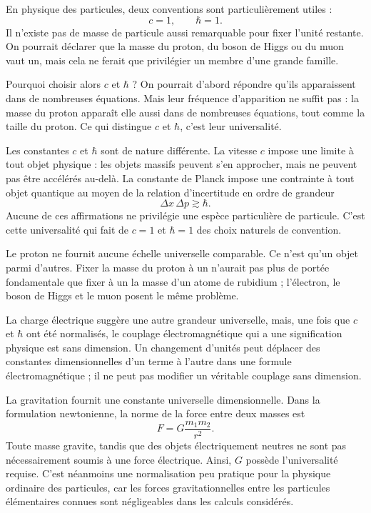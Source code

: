 En physique des particules, deux conventions sont particulièrement utiles :
\begin{equation}
c=1,
\qquad
\hbar=1.
\end{equation}
Il n’existe pas de masse de particule aussi remarquable pour fixer l’unité restante. On pourrait déclarer que la masse du proton, du boson de Higgs ou du muon vaut un, mais cela ne ferait que privilégier un membre d’une grande famille.

Pourquoi choisir alors \(c\) et \(\hbar\) ? On pourrait d’abord répondre qu’ils apparaissent dans de nombreuses équations. Mais leur fréquence d’apparition ne suffit pas : la masse du proton apparaît elle aussi dans de nombreuses équations, tout comme la taille du proton. Ce qui distingue \(c\) et \(\hbar\), c’est leur universalité.

Les constantes \(c\) et \(\hbar\) sont de nature différente. La vitesse \(c\) impose une limite à tout objet physique : les objets massifs peuvent s’en approcher, mais ne peuvent pas être accélérés au-delà. La constante de Planck impose une contrainte à tout objet quantique au moyen de la relation d’incertitude en ordre de grandeur
\begin{equation}
\Delta x\,\Delta p\gtrsim\hbar.
\end{equation}
Aucune de ces affirmations ne privilégie une espèce particulière de particule. C’est cette universalité qui fait de \(c=1\) et \(\hbar=1\) des choix naturels de convention.

Le proton ne fournit aucune échelle universelle comparable. Ce n’est qu’un objet parmi d’autres. Fixer la masse du proton à un n’aurait pas plus de portée fondamentale que fixer à un la masse d’un atome de rubidium ; l’électron, le boson de Higgs et le muon posent le même problème.

La charge électrique suggère une autre grandeur universelle, mais, une fois que \(c\) et \(\hbar\) ont été normalisés, le couplage électromagnétique qui a une signification physique est sans dimension. Un changement d’unités peut déplacer des constantes dimensionnelles d’un terme à l’autre dans une formule électromagnétique ; il ne peut pas modifier un véritable couplage sans dimension.

La gravitation fournit une constante universelle dimensionnelle. Dans la formulation newtonienne, la norme de la force entre deux masses est
\begin{equation}
F=G\frac{m_1m_2}{r^2}.
\end{equation}
Toute masse gravite, tandis que des objets électriquement neutres ne sont pas nécessairement soumis à une force électrique. Ainsi, \(G\) possède l’universalité requise. C’est néanmoins une normalisation peu pratique pour la physique ordinaire des particules, car les forces gravitationnelles entre les particules élémentaires connues sont négligeables dans les calculs considérés.

